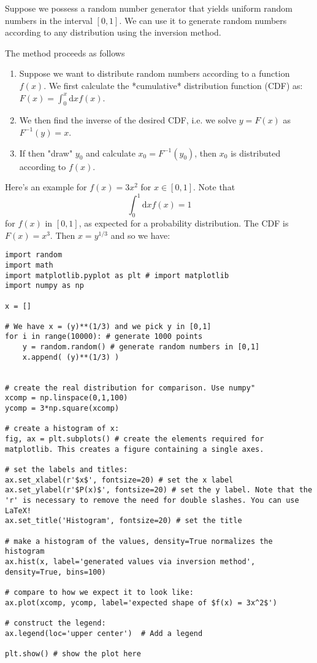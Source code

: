 \documentclass[../../../main.tex]{subfiles}
\begin{document}
Suppose we possess a random number generator that yields uniform random numbers in the interval $[0,1]$. We can use it to generate random numbers according to any distribution using the inversion method. 

The method proceeds as follows
\begin{enumerate}
    \item Suppose we want to distribute random numbers according to a function $f(x)$. We first calculate the *cumulative* distribution function (CDF) as: $F(x) = \int^x_0 \mathrm{d}x f(x)$.
    \item We then find the inverse of the desired CDF, i.e. we solve $y=F(x)$ as $F^{-1}(y)=x$.
    \item If then "draw" $y_0$ and calculate $x_0 = F^{-1}(y_0)$, then $x_0$ is distributed according to $f(x)$.
\end{enumerate}

Here's an example for $f(x)=3x^2$ for $x \in [0,1]$. 
Note that 
\begin{equation*}
    \int_0^1 \mathrm{d} x f(x)= 1
\end{equation*}
for $f(x)$ in $[0,1]$, as expected for a probability distribution.
The CDF is $F(x) = x^3$. 
Then $x = y^{1/3}$ and so we have:
\begin{verbatim}
import random 
import math
import matplotlib.pyplot as plt # import matplotlib
import numpy as np

x = []

# We have x = (y)**(1/3) and we pick y in [0,1] 
for i in range(10000): # generate 1000 points
    y = random.random() # generate random numbers in [0,1]
    x.append( (y)**(1/3) )


# create the real distribution for comparison. Use numpy"
xcomp = np.linspace(0,1,100)
ycomp = 3*np.square(xcomp)
    
# create a histogram of x:
fig, ax = plt.subplots() # create the elements required for matplotlib. This creates a figure containing a single axes.

# set the labels and titles:
ax.set_xlabel(r'$x$', fontsize=20) # set the x label
ax.set_ylabel(r'$P(x)$', fontsize=20) # set the y label. Note that the 'r' is necessary to remove the need for double slashes. You can use LaTeX! 
ax.set_title('Histogram', fontsize=20) # set the title 

# make a histogram of the values, density=True normalizes the histogram
ax.hist(x, label='generated values via inversion method', density=True, bins=100) 

# compare to how we expect it to look like:
ax.plot(xcomp, ycomp, label='expected shape of $f(x) = 3x^2$')

# construct the legend:
ax.legend(loc='upper center')  # Add a legend

plt.show() # show the plot here
\end{verbatim}
\end{document}
